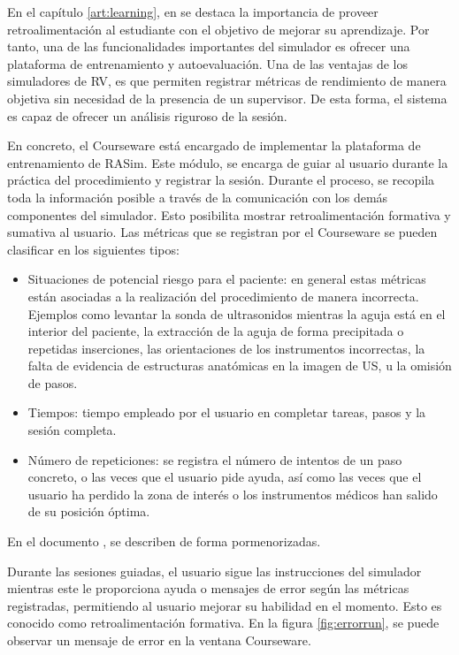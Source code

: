 En el capítulo \ref{art:learning}, en \cite{ericsson1993role} se destaca la importancia de proveer retroalimentación al estudiante con el objetivo de mejorar su aprendizaje. Por tanto, una de las funcionalidades importantes del simulador es ofrecer una plataforma de entrenamiento y autoevaluación. Una de las ventajas de los simuladores de \ac{RV}, es que permiten registrar métricas de rendimiento de manera objetiva sin necesidad de la presencia de un supervisor. De esta forma, el sistema es capaz de ofrecer un análisis riguroso de la sesión.

En concreto, el  \ac{Courseware} está encargado de implementar la plataforma de entrenamiento de \ac{RASim}. Este módulo, se encarga de guiar al usuario durante la práctica del procedimiento y registrar la sesión. Durante el proceso, se recopila toda la información posible a través de la comunicación con los demás componentes del simulador. Esto posibilita mostrar retroalimentación formativa y sumativa al usuario. Las métricas que se registran por el \ac{Courseware} se pueden clasificar en los siguientes tipos:

\begin{itemize}
    \item Situaciones de potencial riesgo para el paciente: en general estas métricas están asociadas a la realización del procedimiento de manera incorrecta. Ejemplos como levantar la sonda de ultrasonidos mientras la aguja está en el interior del paciente, la extracción de la aguja de forma precipitada o repetidas inserciones, las orientaciones de los instrumentos incorrectas, la falta de evidencia de estructuras anatómicas en la imagen de \ac{US}, u la omisión de pasos. 
    
    \item Tiempos: tiempo empleado por el usuario en completar tareas, pasos y la sesión completa. 
    
    \item Número de repeticiones: se registra el número de intentos de un paso concreto, o las veces que el usuario pide ayuda, así como las  veces que el usuario ha perdido la zona de interés o los instrumentos médicos han salido de su posición óptima.
\end{itemize}

En el documento \cite{ded4.4}, se describen de forma pormenorizadas.

Durante las sesiones guiadas, el usuario sigue las instrucciones del simulador mientras este le proporciona ayuda o mensajes de error según las métricas registradas, permitiendo al usuario mejorar su habilidad en el momento. Esto es conocido como retroalimentación formativa. En la figura \ref{fig:errorrun}, se puede observar un mensaje de error en la ventana \ac{Courseware}.


